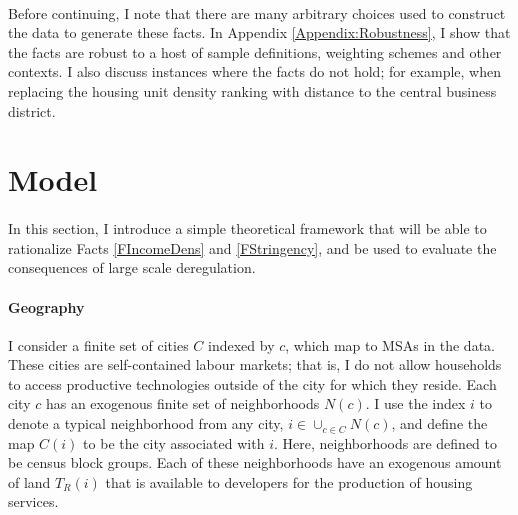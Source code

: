 \documentclass[]{article}
\begin{document}
	\paragraph*{}
Before continuing, I note that there are many arbitrary choices used to construct the data to generate these facts. In Appendix \ref{Appendix:Robustness}, I show that the facts are robust to a host of sample definitions, weighting schemes and other contexts. I also discuss instances where the facts do not hold; for example, when replacing the housing unit density ranking with distance to the central business district. 
	
	\section{Model}\label{Section:Model}
	\paragraph*{}
	In this section, I introduce a simple theoretical framework that will be able to rationalize Facts \ref{FIncomeDens} and \ref{FStringency}, and be used to evaluate the consequences of large scale deregulation. 

\paragraph*{Geography}
I consider a finite set of cities $C$ indexed by $c$, which map to MSAs in the data. These cities are self-contained labour markets; that is, I do not allow households to access productive technologies outside of the city for which they reside. Each city $c$ has an exogenous finite set of neighborhoods $N(c)$. I use the index $i$ to denote a typical neighborhood from any city, $i \in \cup_{c \in C}N(c)$, and define the map $C(i)$ to be the city associated with $i$. Here, neighborhoods are defined to be census block groups. Each of these neighborhoods have an exogenous amount of land $T_{R}(i)$ that is available to developers for the production of housing services. 
\end{document}
